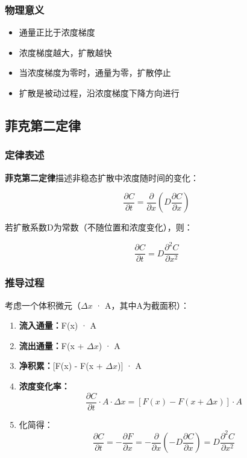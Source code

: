 \documentclass[UTF8,12pt,a4paper]{ctexart}
\begin{document}
\subsubsection{物理意义}

\begin{itemize}
    \item 通量正比于浓度梯度
    \item 浓度梯度越大，扩散越快
    \item 当浓度梯度为零时，通量为零，扩散停止
    \item 扩散是被动过程，沿浓度梯度下降方向进行
\end{itemize}

\subsection{菲克第二定律}

\subsubsection{定律表述}

\textbf{菲克第二定律}描述非稳态扩散中浓度随时间的变化：

\begin{equation}
\frac{\partial C}{\partial t} = \frac{\partial}{\partial x} \left( D \frac{\partial C}{\partial x} \right)
\end{equation}

若扩散系数D为常数（不随位置和浓度变化），则：

\begin{equation}
\frac{\partial C}{\partial t} = D \frac{\partial^2 C}{\partial x^2}
\end{equation}

\subsubsection{推导过程}

考虑一个体积微元（$\Delta x$ · A，其中A为截面积）：

\begin{enumerate}
    \item \textbf{流入通量：}F(x) · A
    \item \textbf{流出通量：}F(x + $\Delta x$) · A
    \item \textbf{净积累：}[F(x) - F(x + $\Delta x$)] · A
    \item \textbf{浓度变化率：}
    \begin{equation}
    \frac{\partial C}{\partial t} \cdot A \cdot \Delta x = [F(x) - F(x + \Delta x)] \cdot A
    \end{equation}
    \item 化简得：
    \begin{equation}
    \frac{\partial C}{\partial t} = -\frac{\partial F}{\partial x} = -\frac{\partial}{\partial x}\left(-D\frac{\partial C}{\partial x}\right) = D\frac{\partial^2 C}{\partial x^2}
    \end{equation}
\end{enumerate}
\end{document}
